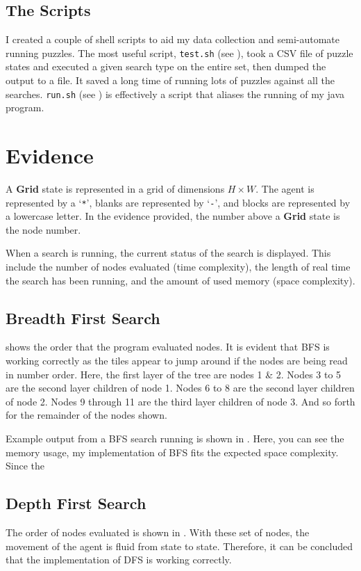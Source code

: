 \documentclass[a4paper]{article}
\def \grid {\textbf{Grid}}
\begin{document}
\subsection{The Scripts}\label{sec:approach_scripts}
I created a couple of shell scripts to aid my data collection and semi-automate running puzzles.
The most useful script, \texttt{test.sh} (see ), took a CSV file of puzzle states and executed a given search type on the entire set, then dumped the output to a file.
It saved a long time of running lots of puzzles against all the searches.
\texttt{run.sh} (see ) is effectively a script that aliases the running of my java program.

\section{Evidence}
A {\grid} state is represented in a grid of dimensions $H \times W$.
The agent is represented by a `\texttt{*}', blanks are represented by `\texttt{-}', and blocks are represented by a lowercase letter.
In the evidence provided, the number above a {\grid} state is the node number.

When a search is running, the current status of the search is displayed.
This include the number of nodes evaluated (time complexity), the length of real time the search has been running, and the amount of used memory (space complexity).

\subsection{Breadth First Search}
 shows the order that the program evaluated nodes.
It is evident that BFS is working correctly as the tiles appear to jump around if the nodes are being read in number order.
Here, the first layer of the tree are nodes 1 \& 2.
Nodes 3 to 5 are the second layer children of node 1.
Nodes 6 to 8 are the second layer children of node 2.
Nodes 9 through 11 are the third layer children of node 3.
And so forth for the remainder of the nodes shown.

Example output from a BFS search running is shown in .
Here, you can see the memory usage, my implementation of BFS fits the expected space complexity.
Since the

\subsection{Depth First Search}
The order of nodes evaluated is shown in .
With these set of nodes, the movement of the agent is fluid from state to state.
Therefore, it can be concluded that the implementation of DFS is working correctly.
\end{document}
